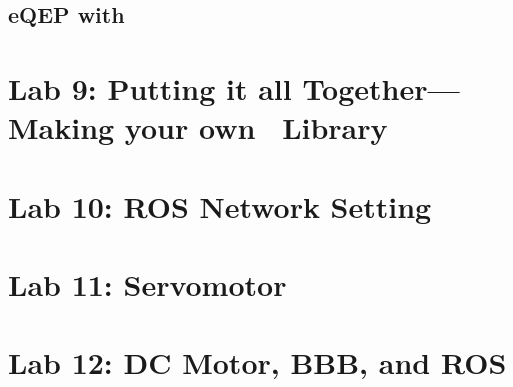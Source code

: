 \documentclass{article}
\let\Oldsection\section
\renewcommand{\section}{\FloatBarrier\Oldsection}
\let\Oldsubsection\subsection
\renewcommand{\subsection}{\FloatBarrier\Oldsubsection}
\def\CC{{C\nolinebreak[4]\hspace{-.05em}\raisebox{.4ex}{\tiny\bf ++}}}
\begin{document}
	\subsection{ eQEP with \protect\CC}
	
	
\clearpage
\section{Lab 9: Putting it all Together---Making your own \protect\CC ~Library}


\clearpage
\section{Lab 10: ROS Network Setting}

\clearpage
\section{Lab 11: Servomotor}

\clearpage
\section{Lab 12: DC Motor, BBB, and ROS}
\end{document}
